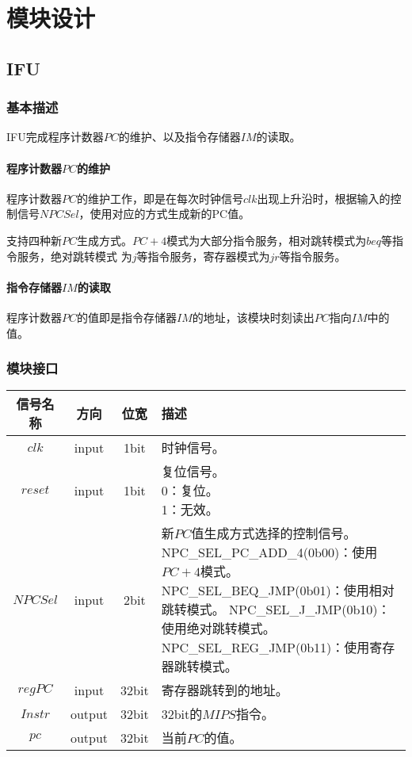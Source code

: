 \documentclass[main.tex]{subfiles}
\begin{document}
\section{模块设计}
\subsection{IFU}
\subsubsection{基本描述}
IFU完成程序计数器$PC$的维护、以及指令存储器$IM$的读取。
\paragraph{程序计数器$PC$的维护}
程序计数器$PC$的维护工作，即是在每次时钟信号$clk$出现上升沿时，根据输入的控制信号$NPCSel$，使用对应的方式生成新的PC值。

支持四种新$PC$生成方式。$PC+4$模式为大部分指令服务，相对跳转模式为$beq$等指令服务，绝对跳转模式 为$j$等指令服务，寄存器模式为$jr$等指令服务。

\paragraph{指令存储器$IM$的读取}
程序计数器$PC$的值即是指令存储器$IM$的地址，该模块时刻读出$PC$指向$IM$中的值。

\subsubsection{模块接口}
\begin{center}
    \begin{tabular}[]{c c c l}
        \toprule
        信号名称 & 方向 & 位宽 & 描述 \\
        \midrule
        $clk$ & input & 1bit & 时钟信号。\\
        $reset$ & input & 1bit & \makecell[lt]{
            复位信号。\\
             0：复位。\\
             1：无效。
        } \\
        $NPCSel$ & input & 2bit & \makecell[lt]{
            新$PC$值生成方式选择的控制信号。\\
            NPC\_SEL\_PC\_ADD\_4(0b00)：使用$PC+4$模式。\\
            NPC\_SEL\_BEQ\_JMP(0b01)：使用相对跳转模式。\\
            NPC\_SEL\_J\_JMP(0b10)：使用绝对跳转模式。\\
            NPC\_SEL\_REG\_JMP(0b11)：使用寄存器跳转模式。
        } \\
        \midrule
        $regPC$ & input & 32bit & 寄存器跳转到的地址。\\
        $Instr$ & output & 32bit & 32bit的$MIPS$指令。\\
        $pc$ & output & 32bit & 当前$PC$的值。 \\
        \bottomrule
    \end{tabular}
\end{center}
\end{document}
